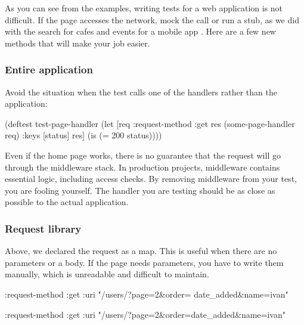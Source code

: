 \fi


As you can see from the examples, writing tests for a web application is not difficult. If the page accesses the network, mock the call or run a stub, as we did with the search for cafes and events for a mobile app . Here are a few new methods that will make your job easier.

\subsubsection*{Entire application}

Avoid the situation when the test calls one of the handlers  rather than the application:

\begin{english}
  \begin{clojure/lines}
(deftest test-page-handler
  (let [req {:request-method :get}
        res (some-page-handler req)
        {:keys [status]} res]
    (is (= 200 status))))
  \end{clojure/lines}
\end{english}

Even if the home page works, there is no guarantee that the request will go through the middleware stack. In production projects, middleware contains essential logic, including access checks. By removing middleware from your test, you are fooling yourself. The handler you are testing should be as close as possible to the actual application.

\subsubsection*{Request library}

Above, we declared the request as a map. This is useful when there are no parameters or a body. If the page needs parameters, you have to write them manually, which is unreadable and difficult to maintain.

\ifnarrow

\begin{english}
  \begin{clojure}
{:request-method :get
 :uri
 "/users/?page=2&order=
                 date_added&name=ivan"}
  \end{clojure}
\end{english}

\else

\begin{english}
  \begin{clojure}
{:request-method :get
 :uri "/users/?page=2&order=date_added&name=ivan"}
  \end{clojure}
\end{english}

